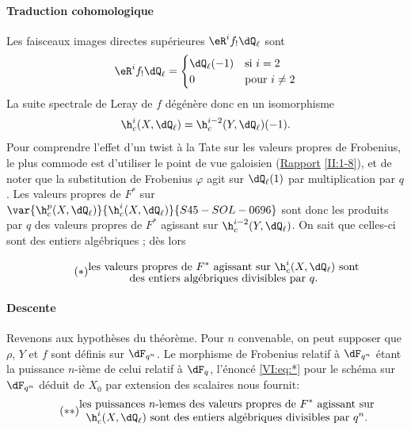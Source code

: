 \paragraph{Traduction cohomologique}
Les faisceaux images directes supérieures $\eR^i f_!\dQ_\ell$ sont 
\[
  \eR^i f_!\dQ_\ell = \begin{cases}
                       \dQ_\ell(-1) & \text{si $i = 2$} \\
                       0            & \text{pour $i\ne 2$}
                     \end{cases}
\]
La suite spectrale de Leray de $f$ dégénère donc en un isomorphisme 
\[
  \h_c^i(X,\dQ_\ell) = \h_c^{i-2}(Y,\dQ_\ell)(-1) \text{.}
\]
Pour comprendre l'effet d'un twist à la Tate sur les valeurs propres de 
Frobenius, le plus commode est d'utiliser le point de vue galoisien 
(\hyperref[II]{Rapport} \ref{II:1-8}), et de noter que la substitution de 
Frobenius $\varphi$ agit sur $\dQ_\ell(1)$ par multiplication par $q$. Les 
valeurs propres de $F^\ast$ sur $\var{\h_c^p(X,\dQ_\ell)}{\h_c^i(X,\dQ_\ell)}{S45-SOL-0696}$ sont donc les produits par 
$q$ des valeurs propres de $F^\ast$ agissant sur $\h_c^{i-2}(Y,\dQ_\ell)$. On 
sait que celles-ci sont des entiers algébriques \cite[XXI 5.2.2]{sga7}; dès 
lors 

\begin{equation*}\tag{$*$}\label{VI:eq:*}
  \substack{\displaystyle\text{les valeurs propres de $F^\ast$ agissant sur $\h_c^i(X,\dQ_\ell)$ sont} \\
  \displaystyle\text{des entiers algébriques divisibles par $q$.}}
\end{equation*}


\paragraph{Descente}
Revenons aux hypothèses du théorème. Pour $n$ convenable, on peut 
supposer que $\rho$, $Y$ et $f$ sont définis sur $\dF_{q^n}$. Le morphisme de 
Frobenius relatif à $\dF_{q^n}$ étant la puissance $n$-ième de celui 
relatif à $\dF_q$, l'énoncé \eqref{VI:eq:*} pour le schéma sur 
$\dF_{q^n}$ déduit de $X_0$ par extension des scalaires nous fournit: 
\begin{equation*}\tag{$**$}\label{VI:eq:**}
  \substack{\displaystyle\text{les puissances $n$-\`iemes des valeurs propres de $F^\ast$ agissant sur} \\ \displaystyle\text{$\h_c^i(X,\dQ_\ell)$ sont des entiers algébriques divisibles par $q^n$.}}
\end{equation*}

